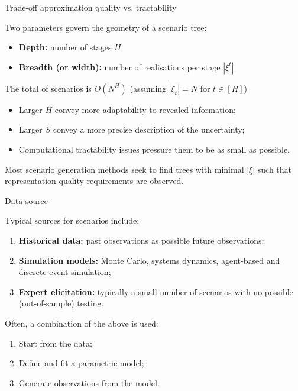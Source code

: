 \begin{frame}{Trade-off approximation quality vs. tractability}

	Two parameters govern the geometry of a scenario tree:
	\vspace{-6pt}
	\begin{itemize}
		\item {\bf Depth:} number of stages $H$
		\item {\bf Breadth (or width):} number of realisations per stage $|\xi^t|$
	\end{itemize}
	
	\pause
	The \alert{total of scenarios} is $O(N^{H})$ (assuming $|\xi_t| = N$ for $t \in [H]$)
	\vspace{-6pt}
	\begin{itemize}
		\item Larger $H$ convey more \alert{adaptability} to revealed information;
		\item Larger $S$ convey a more \alert{precise} description of the uncertainty;
		\item \alert{Computational tractability} issues pressure them to be as small as possible.
	\end{itemize}

	Most scenario generation methods seek to find trees with \alert{minimal $|\xi|$} such that \alert{representation quality} requirements are observed.
	
\end{frame}


\begin{frame}{Data source}

	Typical \alert{sources} for scenarios include:
	\vspace{-6pt}
	\begin{enumerate}
		\item {\bf Historical data:} past observations as possible future observations;
		\item {\bf Simulation models:} Monte Carlo, systems dynamics, agent-based and discrete event simulation;
		\item {\bf Expert elicitation:} typically a small number of scenarios with no possible (out-of-sample) testing. 
	\end{enumerate}
	
	\pause
	Often, a \alert{combination} of the above is used:
	\vspace{-6pt}
	\begin{enumerate}
		\item Start from the \alert{data};
		\item Define and fit a \alert{parametric model};
		\item Generate \alert{observations} from the model.	
	\end{enumerate}
	
\end{frame}


